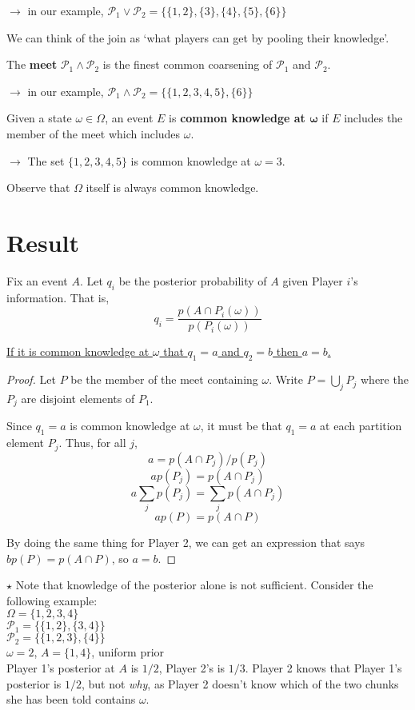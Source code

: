  $\rightarrow$ in our example, $\mathcal{P}_1\lor\mathcal{P}_2=\{\{1,2\},\{3\},\{4\},\{5\},\{6\}\}$
 
 We can think of the join as `what players can get by pooling their knowledge'.
 
 The \textbf{meet} $\mathcal{P}_1\land\mathcal{P}_2$ is the finest common coarsening of $\mathcal{P}_1$ and $\mathcal{P}_2$.
 
  $\rightarrow$ in our example, $\mathcal{P}_1\land\mathcal{P}_2=\{\{1,2,3,4,5\},\{6\}\}$
  
  Given a state $\omega\in \Omega$, an event $E$ is \textbf{common knowledge at $\boldsymbol{\omega}$} if $E$ includes the member of the meet which includes $\omega$.
  
  $\rightarrow$ The set $\{1,2,3,4,5\}$ is common knowledge at $\omega=3$.
  
  Observe that $\Omega$ itself is always common knowledge.
  
  \section*{Result}
  Fix an event $A$.  Let $q_i$ be the posterior probability of $A$ given Player $i$'s information.  That is,
  $$q_i=\frac{p(A\cap P_i(\omega))}{p(P_i(\omega))}$$
  
 \underline{ If it is common knowledge at $\omega$ that $q_1=a$ and $q_2=b$ then $a=b$.}
 
 \begin{proof}
 	Let $P$ be the member of the meet containing $\omega$.  Write $P=\bigcup\limits_j P_j$ where the $P_j$ are disjoint elements of $P_1$.
 	
 	Since $q_1=a$ is common knowledge at $\omega$, it must be that $q_1=a$ at each partition element $P_j$.  Thus, for all $j$,
 	$$a=p(A\cap P_j)/p(P_j)$$
 	$$ap(P_j)=p(A\cap P_j)$$
 	$$a\sum\limits_j p(P_j) = \sum\limits_j p(A\cap P_j)$$
 	$$ap(P)=p(A\cap P)$$
 	
 By doing the same thing for Player 2, we can get an expression that says $bp(P)=p(A\cap P)$, so $a=b$.
 \end{proof}
  
  
  $\star$ Note that knowledge of the posterior alone is not sufficient.  Consider the following example:\\
  $\Omega=\{1,2,3,4\}$\\$\mathcal{P}_1=\{\{1,2\},\{3,4\}\}$\\$\mathcal{P}_2=\{\{1,2,3\},\{4\}\}$\\$\omega=2$, $A=\{1,4\}$, uniform prior\\
  
  Player 1's posterior at $A$ is $1/2$, Player 2's is $1/3$.  Player 2 knows that Player 1's posterior is $1/2$, but not \textit{why}, as Player 2 doesn't know which of the two chunks she has been told contains $\omega$.




















